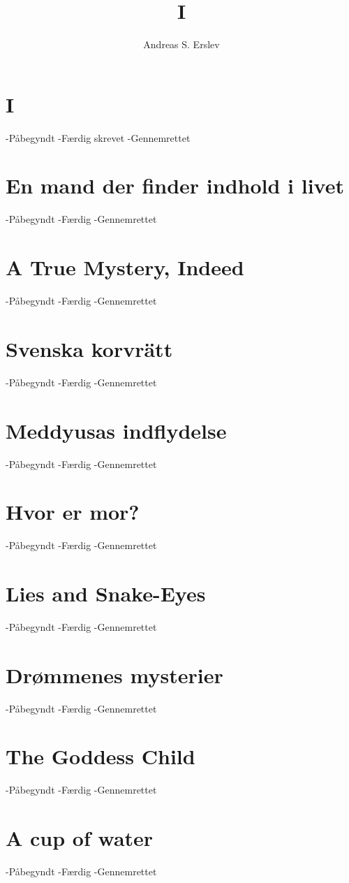 \documentclass[]{article}
\title{I}
\author{Andreas S. Erslev}
\begin{document}
	
	\section{I}
	-Påbegyndt \checkmark
	-Færdig skrevet \checkmark
	-Gennemrettet \checkmark
	
	\section{En mand der finder indhold i livet}
	-Påbegyndt \checkmark
	-Færdig \checkmark
	-Gennemrettet
	
	\section{A True Mystery, Indeed}
	-Påbegyndt \checkmark
	-Færdig \checkmark
	-Gennemrettet
	
	\section{Svenska korvrätt}
	-Påbegyndt \checkmark
	-Færdig \checkmark
	-Gennemrettet
	
	\section{Meddyusas indflydelse}
	-Påbegyndt
	-Færdig
	-Gennemrettet
	
	\section{Hvor er mor?}
	-Påbegyndt
	-Færdig
	-Gennemrettet
	
	\section{Lies and Snake-Eyes}
	-Påbegyndt \checkmark
	-Færdig \checkmark
	-Gennemrettet
	
	\section{Drømmenes mysterier}
	-Påbegyndt
	-Færdig
	-Gennemrettet
	
	\section{The Goddess Child}
	-Påbegyndt \checkmark
	-Færdig
	-Gennemrettet
	
	\section{A cup of water}
	-Påbegyndt \checkmark
	-Færdig \checkmark
	-Gennemrettet
	
\end{document}
